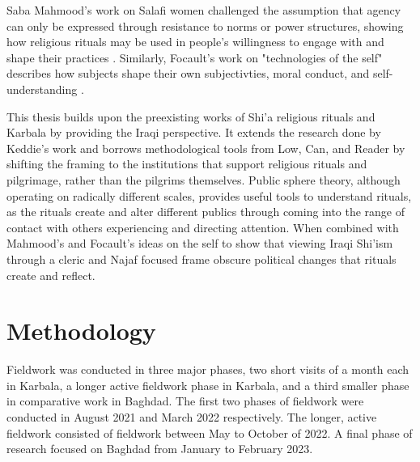 Saba Mahmood's work on Salafi women challenged the assumption that agency can only be expressed through resistance to norms or power structures, showing how religious rituals may be used in people's willingness to engage with and shape their practices \cite{mahmood_politics_2005}. Similarly, Focault's work on "technologies of the self" describes how subjects shape their own subjectivties, moral conduct, and self-understanding \cite{foucault_technologies_1988}.


This thesis builds upon the preexisting works of Shi'a religious rituals and Karbala by providing the Iraqi perspective. It extends the research done by Keddie's work and borrows methodological tools from Low, Can, and Reader by shifting the framing to the institutions that support religious rituals and pilgrimage, rather than the pilgrims themselves. Public sphere theory, although operating on radically different scales, provides useful tools to understand rituals, as the rituals create and alter different publics through coming into the range of contact with others experiencing and directing attention. When combined with Mahmood's and Focault's ideas on the self to show that viewing Iraqi Shi'ism through a cleric and Najaf focused frame obscure political changes that rituals create and reflect.

\section{Methodology}
Fieldwork was conducted in three major phases, two short visits of a month each in Karbala, a longer active fieldwork phase in Karbala, and a third smaller phase in comparative work in Baghdad. The first two phases of fieldwork were conducted in August 2021 and March 2022 respectively. The longer, active fieldwork consisted of fieldwork between May to October of 2022. A final phase of research focused on Baghdad from January to February 2023. 

